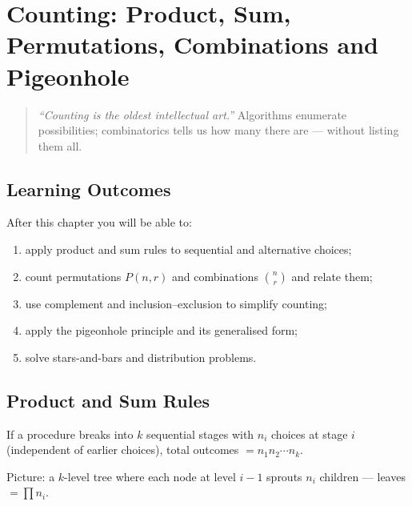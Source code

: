 \chapter[Counting]{Counting: Product, Sum, Permutations, Combinations and Pigeonhole}
\label{ch:counting}

\begin{quote}
\emph{``Counting is the oldest intellectual art.''} Algorithms enumerate possibilities; combinatorics tells us how many there are --- without listing them all.
\end{quote}

\noindent{}
\vspace{0.4em}

\section*{Learning Outcomes}
After this chapter you will be able to:
\begin{enumerate}[label=(L\arabic*)]
    \item apply product and sum rules to sequential and alternative choices;
    \item count permutations $P(n,r)$ and combinations $\binom{n}{r}$ and relate them;
    \item use complement and inclusion--exclusion to simplify counting;
    \item apply the pigeonhole principle and its generalised form;
    \item solve stars-and-bars and distribution problems.
\end{enumerate}

\section{Product and Sum Rules}
\label{sec:product-sum}
\begin{definition}
If a procedure breaks into $k$ sequential stages with $n_i$ choices at stage $i$ (independent of earlier choices), total outcomes $=n_1n_2\cdots n_k$.
\end{definition}
Picture: a $k$-level tree where each node at level $i-1$ sprouts $n_i$ children --- leaves $=\prod n_i$.

